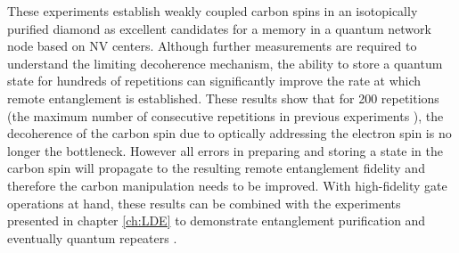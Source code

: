 These experiments establish weakly coupled carbon spins in an isotopically purified diamond as excellent candidates for a memory in a quantum network node based on NV centers. Although further measurements are required to understand the limiting decoherence mechanism, the ability to store a quantum state for hundreds of repetitions can significantly improve the rate at which remote entanglement is established. These results show that for 200 repetitions (the maximum number of consecutive repetitions in previous experiments \cite{Bernien_Nature_2013,Pfaff_Science_2014}), the decoherence of the carbon spin due to optically addressing the electron spin is no longer the bottleneck. However all errors in preparing and storing a state in the carbon spin will propagate to the resulting remote entanglement fidelity and therefore the carbon manipulation needs to be improved. With high-fidelity gate operations at hand, these results can be combined with the experiments presented in chapter \ref{ch:LDE} to demonstrate entanglement purification\cite{Campbell_Phys.Rev.Lett._2008} and eventually quantum repeaters \cite{Briegel_Phys.Rev.Lett._1998}.

\clearpage




